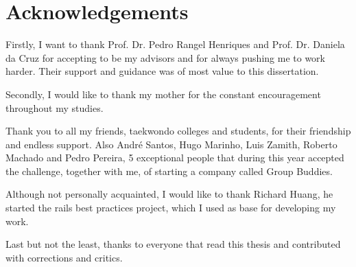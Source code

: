 \thispagestyle{empty}
\chapter*{Acknowledgements}\label{chap:acknowledgements}

Firstly, I want to thank Prof. Dr. Pedro Rangel Henriques and Prof. Dr. Daniela da Cruz 
for accepting to be my advisors and for always pushing me to work harder. 
Their support and guidance was of most value to this dissertation.

Secondly, I would like to thank my mother for the constant encouragement throughout my studies.

Thank you to all my friends, taekwondo colleges and students, for their friendship and endless support.
Also André Santos, Hugo Marinho, Luis Zamith, Roberto Machado and Pedro Pereira, 5 exceptional people 
that during this year accepted the challenge, together with me, of starting a company called Group Buddies.

Although not personally acquainted, I would like to thank Richard Huang, he started the rails best practices project, 
which I used as base for developing my work.  

Last but not the least, thanks to everyone that read this thesis and contributed with corrections and critics.